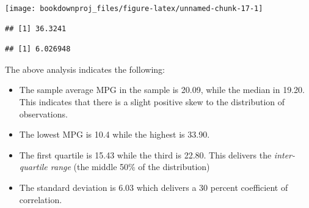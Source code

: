 \documentclass[
]{book}
\newenvironment{Shaded}{\begin{snugshade}}{\end{snugshade}}
\newcommand{\AttributeTok}[1]{\textcolor[rgb]{0.13,0.29,0.53}{#1}}
\newcommand{\CommentTok}[1]{\textcolor[rgb]{0.56,0.35,0.01}{\textit{#1}}}
\newcommand{\DecValTok}[1]{\textcolor[rgb]{0.00,0.00,0.81}{#1}}
\newcommand{\FunctionTok}[1]{\textcolor[rgb]{0.13,0.29,0.53}{\textbf{#1}}}
\newcommand{\NormalTok}[1]{#1}
\newcommand{\SpecialCharTok}[1]{\textcolor[rgb]{0.81,0.36,0.00}{\textbf{#1}}}
\newcommand{\StringTok}[1]{\textcolor[rgb]{0.31,0.60,0.02}{#1}}
\begin{document}
\begin{Shaded}
\end{Shaded}

\begin{center}\texttt{[image: bookdownproj\_files/figure-latex/unnamed-chunk-17-1]} \end{center}

\begin{Shaded}
\end{Shaded}

\begin{verbatim}
## [1] 36.3241
\end{verbatim}

\begin{Shaded}
\end{Shaded}

\begin{verbatim}
## [1] 6.026948
\end{verbatim}

The above analysis indicates the following:

\begin{itemize}
\item
  The sample average MPG in the sample is 20.09, while the median in 19.20. This indicates that there is a slight positive skew to the distribution of observations.
\item
  The lowest MPG is 10.4 while the highest is 33.90.
\item
  The first quartile is 15.43 while the third is 22.80. This delivers the \emph{inter-quartile range} (the middle 50\% of the distribution)
\item
  The standard deviation is 6.03 which delivers a 30 percent coefficient of correlation.
\end{itemize}
\end{document}
